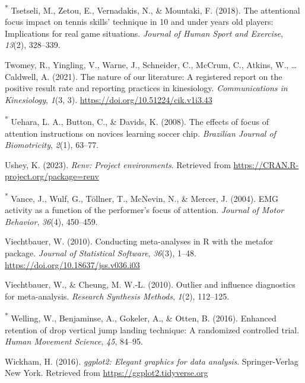\documentclass[
  man, donotrepeattitle,floatsintext]{apa7}
\newlength{\cslhangindent}
\newlength{\cslentryspacingunit} %
\newenvironment{CSLReferences}[2] %
 {%
  \setlength{\parindent}{0pt}
  \ifodd #1
  \let\oldpar\par
  \def\par{\hangindent=\cslhangindent\oldpar}
  \fi
  \setlength{\parskip}{#2\cslentryspacingunit}
 }%
 {}
\begin{document}
\begin{CSLReferences}{1}{0}
\leavevmode{}%
\textsuperscript{*} Tsetseli, M., Zetou, E., Vernadakis, N., \& Mountaki, F. (2018). The attentional focus impact on tennis skills' technique in 10 and under years old players: Implications for real game situations. \emph{Journal of Human Sport and Exercise}, \emph{13}(2), 328--339.

\leavevmode{}%
Twomey, R., Yingling, V., Warne, J., Schneider, C., McCrum, C., Atkins, W., \ldots{} Caldwell, A. (2021). The nature of our literature: {A} registered report on the positive result rate and reporting practices in kinesiology. \emph{Communications in Kinesiology}, \emph{1}(3, 3). \url{https://doi.org/10.51224/cik.v1i3.43}

\leavevmode{}%
\textsuperscript{*} Uehara, L. A., Button, C., \& Davids, K. (2008). The effects of focus of attention instructions on novices learning soccer chip. \emph{Brazilian Journal of Biomotricity}, \emph{2}(1), 63--77.

\leavevmode{}%
Ushey, K. (2023). \emph{Renv: Project environments}. Retrieved from \url{https://CRAN.R-project.org/package=renv}

\leavevmode{}%
\textsuperscript{*} Vance, J., Wulf, G., Töllner, T., McNevin, N., \& Mercer, J. (2004). EMG activity as a function of the performer's focus of attention. \emph{Journal of Motor Behavior}, \emph{36}(4), 450--459.

\leavevmode{}%
Viechtbauer, W. (2010). Conducting meta-analyses in {R} with the {metafor} package. \emph{Journal of Statistical Software}, \emph{36}(3), 1--48. \url{https://doi.org/10.18637/jss.v036.i03}

\leavevmode{}%
Viechtbauer, W., \& Cheung, M. W.-L. (2010). Outlier and influence diagnostics for meta-analysis. \emph{Research Synthesis Methods}, \emph{1}(2), 112--125.

\leavevmode{}%
\textsuperscript{*} Welling, W., Benjaminse, A., Gokeler, A., \& Otten, B. (2016). Enhanced retention of drop vertical jump landing technique: A randomized controlled trial. \emph{Human Movement Science}, \emph{45}, 84--95.

\leavevmode{}%
Wickham, H. (2016). \emph{ggplot2: Elegant graphics for data analysis}. Springer-Verlag New York. Retrieved from \url{https://ggplot2.tidyverse.org}


\end{CSLReferences}
\end{document}
